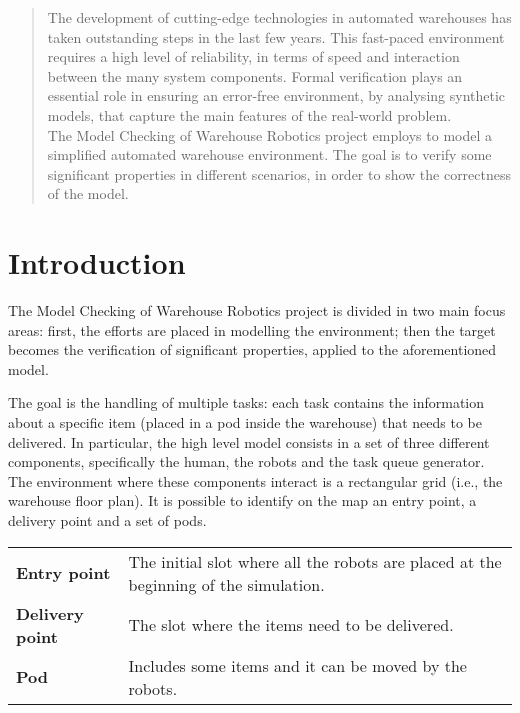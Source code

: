 \begin{abstract}
The development of cutting-edge technologies in automated warehouses has taken outstanding steps in the last few years. 
This fast-paced environment requires a high level of reliability, in terms of speed and interaction between the many system components.
Formal verification plays an essential role in ensuring an error-free environment, by analysing synthetic models, that capture the main features of the real-world problem.\\
The Model Checking of Warehouse Robotics project employs \UPPAAL to model a simplified automated warehouse environment. The goal is to verify some significant properties in different scenarios, in order to show the correctness of the model.
\end{abstract}

\section{Introduction}
The Model Checking of Warehouse Robotics project is divided in two main focus areas: first, the efforts are placed in modelling the environment; then the target becomes the verification of significant properties, applied to the aforementioned model.

The goal is the handling of multiple tasks: each task contains the information about a specific item (placed in a pod inside the warehouse) that needs to be delivered. 
In particular, the high level model consists in a set of three different components, specifically the human, the robots and the task queue generator.
The environment where these components interact is a rectangular grid (i.e., the warehouse floor plan). It is possible to identify on the map an entry point, a delivery point and a set of pods.

\begin{table}[h!]
\begin{tabularx}{\textwidth}{lX}
\textbf{Entry point} & The initial slot where all the robots are placed at the beginning of the simulation.\vspace{0,2cm}\\
\textbf{Delivery point} & The slot where the items need to be delivered.\vspace{0,2cm}\\
\textbf{Pod} & Includes some items and it can be moved by the robots.\vspace{0,2cm}\\
\end{tabularx}
\end{table}

